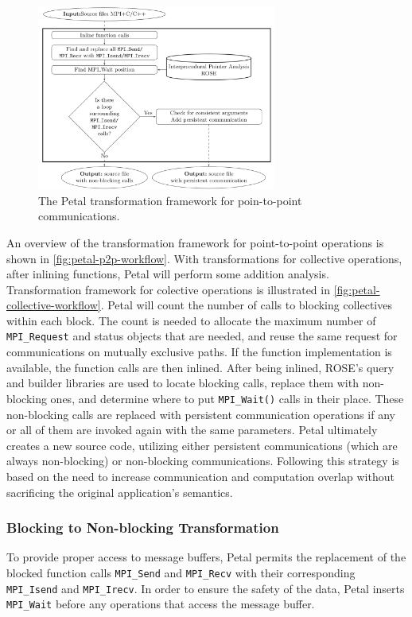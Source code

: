 \begin{figure}[!h]
    \centering
    \includegraphics[width=0.7\textwidth]{pictures/petal_p2p_workflow.png}
    \caption{The Petal transformation framework for poin-to-point communications. \cite{ahmed_petal_2016}}
    \label{fig:petal-p2p-workflow}
\end{figure}
An overview of the transformation framework for point-to-point operations is shown in \autoref{fig:petal-p2p-workflow}. 
With transformations for collective operations, after inlining functions, Petal will perform some addition analysis. Transformation framework for colective operations is illustrated in \autoref{fig:petal-collective-workflow}. Petal will count the number of calls to blocking collectives within each block. 
The count is needed to allocate the maximum number of \texttt{MPI\_Request} and status objects that are needed, and reuse the same request for communications on mutually exclusive paths. 
If the function implementation is available, the function calls are then inlined. After being inlined, ROSE's query and builder libraries are used to locate blocking calls, replace them with non-blocking ones, and determine where to put \texttt{MPI\_Wait()} calls in their place. 
These non-blocking calls are replaced with persistent communication operations if any or all of them are invoked again with the same parameters. 
Petal ultimately creates a new source code, utilizing either persistent communications (which are always non-blocking) or non-blocking communications.  Following this strategy is based on the need to increase communication and computation overlap without sacrificing the original application's semantics.
\subsubsection{Blocking to Non-blocking Transformation}
To provide proper access to message buffers, Petal permits the replacement of the blocked function calls \texttt{MPI\_Send} and \texttt{MPI\_Recv} with their corresponding \texttt{MPI\_Isend} and \texttt{MPI\_Irecv}. 
In order to ensure the safety of the data, Petal inserts \texttt{MPI\_Wait} before any operations that access the message buffer. \cite{ahmed_petal_2016}

